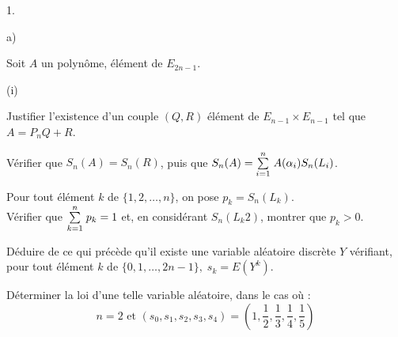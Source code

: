 \documentclass[11pt]{article}%
\begin{document}
\begin{noliste}{1.}
\begin{noliste}{a)}
\item Soit $A$ un polynôme, élément de $E_{2n-1}$.

\begin{nonoliste}{(i)}
\item Justifier l'existence d'un couple $(Q,R)$ élément de
$E_{n-1}\times
E_{n-1}$ tel que $A = P_{n}Q + R$.

\item Vérifier que $S_{n}(A) = S_{n}(R)$, puis que $S_{n}(A) = {\textstyle\sum\limits_{i =
1}^{n}}\hspace{.1cm}A(\alpha_{i})S_{n}(L_{i})$.
\end{nonoliste}

\item Pour tout élément $k$ de $\{1,2,\dots,n\}$, on pose $p_{k} =
S_{n}(L_{k})$.\\
Vérifier que ${\textstyle\sum\limits_{k = 1}^{n}}\hspace{.1cm}p_{k} = 1$ et, en considérant
$S_{n}(L_{k}{2})$, montrer que $p_{k}>0$.

\item Déduire de ce qui précède qu'il existe une variable aléatoire
discrète
$Y$ vérifiant, pour tout élément $k$ de $\{0,1,\dots,2n-1\},\;s_{k} =
E(Y^{k}) $.

\item Déterminer la loi d'une telle variable aléatoire, dans le cas où
:
\[
n = 2\text{ et }(s_{0},s_{1},s_{2},s_{3},s_{4}) = \left(
1,\dfrac{1}{2},\dfrac{1}{3},\dfrac{1}{4},\dfrac{1}{5}\right)
\]
\end{noliste}
\end{noliste}

\label{fin}
\end{document}
